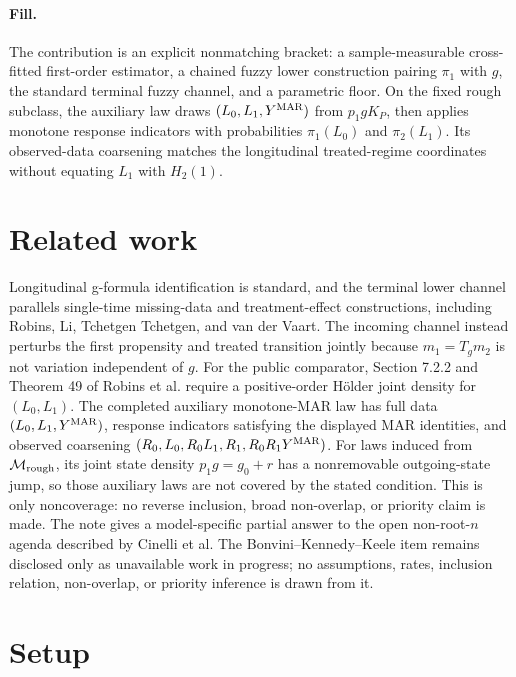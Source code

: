 \documentclass{article}
\begin{document}
\paragraph{Fill.} The contribution is an explicit nonmatching bracket: a sample-measurable cross-fitted first-order estimator, a chained fuzzy lower construction pairing \(\pi_1\) with \(g\), the standard terminal fuzzy channel, and a parametric floor. On the fixed rough subclass, the auxiliary law draws \((L_0,L_1,Y^{\rm MAR})\) from \(p_1gK_P\), then applies monotone response indicators with probabilities \(\pi_1(L_0)\) and \(\pi_2(L_1)\). Its observed-data coarsening matches the longitudinal treated-regime coordinates without equating \(L_1\) with \(H_2(1)\).

\section{Related work}

Longitudinal g-formula identification is standard, and the terminal lower channel parallels single-time missing-data and treatment-effect constructions, including Robins, Li, Tchetgen Tchetgen, and van der Vaart. The incoming channel instead perturbs the first propensity and treated transition jointly because \(m_1=T_gm_2\) is not variation independent of \(g\). For the public comparator, Section 7.2.2 and Theorem 49 of Robins et al. require a positive-order H\"older joint density for \((L_0,L_1)\). The completed auxiliary monotone-MAR law has full data \((L_0,L_1,Y^{\rm MAR})\), response indicators satisfying the displayed MAR identities, and observed coarsening \( (R_0,L_0,R_0L_1,R_1,R_0R_1Y^{\rm MAR})\). For laws induced from \(\mathcal M_{\rm rough}\), its joint state density \(p_1g=g_0+r\) has a nonremovable outgoing-state jump, so those auxiliary laws are not covered by the stated condition. This is only noncoverage: no reverse inclusion, broad non-overlap, or priority claim is made. The note gives a model-specific partial answer to the open non-root-\(n\) agenda described by Cinelli et al. The Bonvini--Kennedy--Keele item remains disclosed only as unavailable work in progress; no assumptions, rates, inclusion relation, non-overlap, or priority inference is drawn from it.

\section{Setup}
\end{document}
